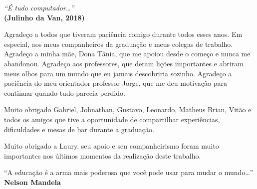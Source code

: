 \newpage
\vspace*{\fill}
\begin{flushright}
    \textit{``É tudo computador\ldots''}\\
    \textbf{(Julinho da Van, 2018)}
\end{flushright}

\begin{agradecimentos}
  Agradeço a todos que tiveram paciência comigo durante todos esses anos. Em
  especial, aos meus companheiros da graduação e meus colegas de trabalho.
  Agradeço a minha mãe, Dona Tânia, que me apoiou desde o começo e nunca me
  abandonou. Agradeço aos professores, que deram lições importantes e abriram
  meus olhos para um mundo que eu jamais descobriria sozinho. Agradeço a
  paciência do meu orientador professor Jorge, que me deu motivação para
  continuar quando tudo parecia perdido.

  Muito obrigado Gabriel, Johnathan, Gustavo, Leonardo, Matheus Brian, Vitão e
  todos os amigos que tive a oportunidade de compartilhar experiências,
  dificuldades e mesas de bar durante a graduação.

  Muito obrigado a Laury, seu apoio e seu companheirismo foram muito importantes
  nos últimos momentos da realização deste trabalho.
\end{agradecimentos}

\begin{epigrafe}
  \vspace*{\fill}
  \begin{flushright}
    ``A educação é a arma mais poderosa que você pode usar para mudar o mundo\ldots''\\
    \vspace{\baselineskip}
    \textbf{Nelson Mandela}\\
  \end{flushright}
\end{epigrafe}



